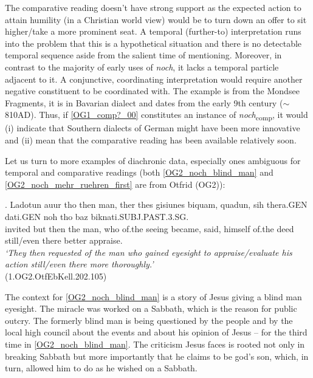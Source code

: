 \documentclass[output=paper,
modfonts
]{langscibook}
\begin{document}
The comparative reading doesn't have strong support as the expected action to attain humility (in a Christian world view) would be to turn down an offer to sit higher/take a more prominent seat. A temporal (further-to) interpretation runs into the problem that this is a hypothetical situation and there is no detectable temporal sequence aside from the salient time of mentioning. Moreover, in contrast to the majority of early uses of \textit{noch}, it lacks a temporal particle adjacent to it. A conjunctive, coordinating interpretation would require another negative constituent to be coordinated with. The example is from the Mondsee Fragments, it is in Bavarian dialect and dates from the early 9th century ($\sim$ 810AD)\citep{annis_og}. Thus, if \ref{OG1_comp?_00} constitutes an instance of \textit{noch}\textsubscript{comp}, it would (i) indicate that Southern dialects of German might have been more innovative and (ii) mean that the comparative reading has been available relatively soon.

Let us turn to more examples of diachronic data, especially ones ambiguous for temporal and comparative readings (both \ref{OG2_noch_blind_man} and \ref{OG2_noch_mehr_ruehren_first} are from Otfrid (OG2)):

\exg. Ladotun auur tho then man, ther thes gisiunes biquam, quadun, sih thera.GEN dati.GEN noh tho baz biknati.SUBJ.PAST.3.SG.\\
invited but then the man, who of.the seeing became, said, himself of.the deed still/even there better appraise.\\
\textit{`They then requested of the man who gained eyesight to appraise/evaluate his action still/even there more thoroughly.'}\label{OG2_noch_blind_man} \\ \flushright \vspace{-24pt} (1.OG2.OtfEbKell.202.105)

The context for \ref{OG2_noch_blind_man} is a story of Jesus giving a blind man eyesight. The miracle was worked on a Sabbath, which is the reason for public outcry. The formerly blind man is being questioned by the people and by the local high council about the events and about his opinion of Jesus -- for the third time in \ref{OG2_noch_blind_man}. The criticism Jesus faces is rooted not only in breaking Sabbath but more importantly that he claims to be god's son, which, in turn, allowed him to do as he wished on a Sabbath.
\end{document}
